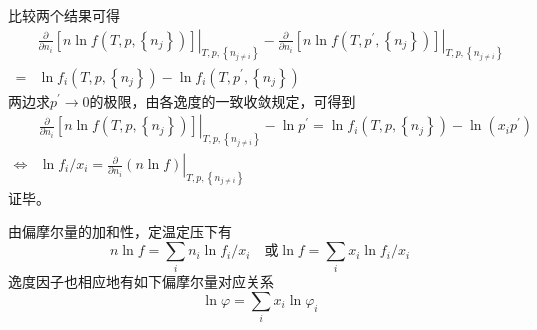 \documentclass[main.tex]{subfiles}
\begin{document}
比较两个结果可得
\begin{align*}
      & \left.\frac{\partial}{\partial n_i}\left[n\ln f\left(T,p,\left\{n_j\right\}\right)\right]\right|_{T,p,\left\{n_{j\neq i}\right\}}-\left.\frac{\partial}{\partial n_i}\left[n\ln f\left(T,p^\prime,\left\{n_j\right\}\right)\right]\right|_{T,p,\left\{n_{j\neq i}\right\}} \\
    = & \ln f_i\left(T,p,\left\{n_j\right\}\right)-\ln f_i\left(T,p^\prime,\left\{n_j\right\}\right)
\end{align*}
两边求$p^\prime\rightarrow 0$的极限，由各逸度的一致收敛规定，可得到
\begin{align*}
                    & \left.\frac{\partial}{\partial n_i}\left[n\ln f\left(T,p,\left\{n_j\right\}\right)\right]\right|_{T,p,\left\{n_{j\neq i}\right\}}-\ln p^\prime=\ln f_i\left(T,p,\left\{n_j\right\}\right)-\ln\left(x_ip^\prime\right) \\
    \Leftrightarrow & \ln f_i/x_i=\left.\frac{\partial}{\partial n_i}\left(n\ln f\right)\right|_{T,p,\left\{n_{j\neq i}\right\}}
\end{align*}
证毕。

由偏摩尔量的加和性，定温定压下有
\[n\ln f=\sum_i n_i\ln f_i/x_i\quad\text{或}\ln f=\sum_ix_i\ln f_i/x_i\]
逸度因子也相应地有如下偏摩尔量对应关系
\[\ln \varphi=\sum_ix_i\ln\varphi_i\]
\end{document}
